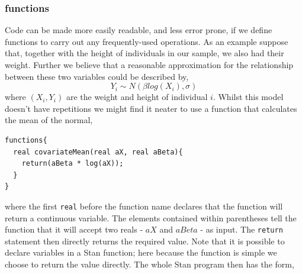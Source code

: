 \documentclass[11pt,fullpage]{book}
\begin{document}
\subsubsection{functions}
Code can be made more easily readable, and less error prone, if we define functions to carry out any frequently-used operations. As an example suppose that, together with the height of individuals in our sample, we also had their weight. Further we believe that a reasonable approximation for the relationship between these two variables could be described by,
%
\begin{equation}
Y_i \sim N(\beta log(X_i),\sigma)
\end{equation}
%
where $(X_i,Y_i)$ are the weight and height of individual $i$. Whilst this model doesn't have repetitions we might find it neater to use a function that calculates the mean of the normal,

\begin{verbatim}
functions{
  real covariateMean(real aX, real aBeta){
    return(aBeta * log(aX));
  }
}
\end{verbatim}

where the first \texttt{real} before the function name declares that the function will return a continuous variable. The elements contained within parentheses tell the function that it will accept two reals - $aX$ and $aBeta$ - as input. The \texttt{return} statement then directly returns the required value. Note that it is possible to declare variables in a Stan function; here because the function is simple we choose to return the value directly. The whole Stan program then has the form,
\end{document}
